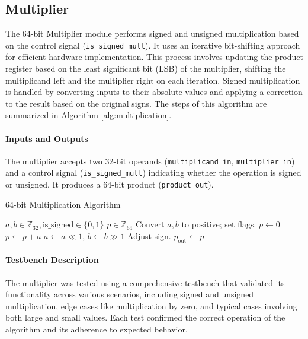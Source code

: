 \documentclass[12pt]{article}
\begin{document}
\subsection*{Multiplier}

The 64-bit Multiplier module performs signed and unsigned multiplication based on the control signal (\texttt{is\_signed\_mult}). It uses an iterative bit-shifting approach for efficient hardware implementation. This process involves updating the product register based on the least significant bit (LSB) of the multiplier, shifting the multiplicand left and the multiplier right on each iteration. Signed multiplication is handled by converting inputs to their absolute values and applying a correction to the result based on the original signs. The steps of this algorithm are summarized in Algorithm \ref{alg:multiplication}.

\paragraph{Inputs and Outputs}
The multiplier accepts two 32-bit operands (\texttt{multiplicand\_in}, \texttt{multiplier\_in}) and a control signal (\texttt{is\_signed\_mult}) indicating whether the operation is signed or unsigned. It produces a 64-bit product (\texttt{product\_out}).

\begin{algorithm}[ht!]
    \caption{64-bit Multiplication Algorithm}
    \label{alg:multiplication}
    \begin{algorithmic}[1]
        \REQUIRE $a, b \in \mathbb{Z}_{32}, \text{is\_signed} \in \{0, 1\}$
        \ENSURE $p \in \mathbb{Z}_{64}$
            \STATE Convert $a, b$ to positive; set flags.
        \ENDIF
        \STATE $p \leftarrow 0$
                \STATE $p \leftarrow p + a$
            \ENDIF
            \STATE $a \leftarrow a \ll 1$, $b \leftarrow b \gg 1$
        \ENDFOR
            \STATE Adjust sign.
        \ENDIF
        \STATE $p_{\text{out}} \leftarrow p$
    \end{algorithmic}
\end{algorithm}

\paragraph{Testbench Description}
The multiplier was tested using a comprehensive testbench that validated its functionality across various scenarios, including signed and unsigned multiplication, edge cases like multiplication by zero, and typical cases involving both large and small values. Each test confirmed the correct operation of the algorithm and its adherence to expected behavior.
\end{document}
